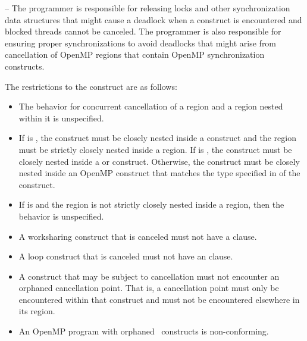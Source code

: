 \notestart
\noteheader – The programmer is responsible for releasing locks and
other synchronization data structures that might cause a deadlock when
a  construct is encountered and blocked threads cannot be
canceled. The programmer is also responsible for ensuring proper
synchronizations to avoid deadlocks that might arise from cancellation
of OpenMP regions that contain OpenMP synchronization constructs.
\noteend

\restrictions
The restrictions to the  construct are as follows:

\begin{itemize}
\item The behavior for concurrent cancellation of a region and a region nested within it is 
unspecified.

\item If  is , the 
construct must be closely nested inside a  construct and the
 region must be strictly closely nested inside a  region. If
 is , the  construct
must be closely nested inside a  or  construct.
Otherwise, the  construct must be closely
nested inside an OpenMP construct that matches the type specified in
 of the  construct.

\item If  is  and the  region is not strictly closely nested 
inside a  region, then the behavior is unspecified.

\item A worksharing construct that is canceled must not have a  clause.

\item A loop construct that is canceled must not have an  clause.

\item A construct that may be subject to cancellation must not encounter an orphaned 
cancellation point. That is, a cancellation point must only be encountered within that 
construct and must not be encountered elsewhere in its region.

\item An OpenMP program with orphaned ~\code constructs is 
non-conforming. 
\end{itemize}

